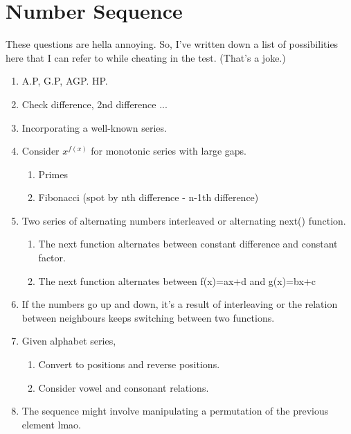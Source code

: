 \section{Number Sequence}
These questions are hella annoying. So, I've written down a list of possibilities 
here that I can refer to while cheating in the test. (That's a joke.)
\begin{enumerate}
    \item A.P, G.P, AGP. HP.
    \item Check difference, 2nd difference ...
    \item Incorporating a well-known series.
    \item Consider $x^{f(x)}$ for monotonic series with large gaps.
    \begin{enumerate}
        \item Primes
        \item Fibonacci (spot by nth difference - n-1th difference)
    \end{enumerate}
    \item Two series of alternating numbers interleaved or alternating next() function.
    \begin{enumerate}
        \item The next function alternates between constant difference and constant factor.
        \item The next function alternates between f(x)=ax+d and g(x)=bx+c
    \end{enumerate}
    \item If the numbers go up and down, it's a result of interleaving or the relation between neighbours keeps switching between two functions.
    \item Given alphabet series,
    \begin{enumerate}
        \item Convert to positions and reverse positions.
        \item Consider vowel and consonant relations.
    \end{enumerate}
    \item The sequence might involve manipulating a permutation of the previous element lmao.
\end{enumerate}
